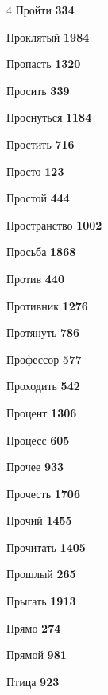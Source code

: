 \begin{multicols}{4}
\noindent Пройти \dotfill \textbf{\color{secondary} 334}\par
\noindent Проклятый \dotfill \textbf{\color{secondary} 1984}\par
\noindent Пропасть \dotfill \textbf{\color{secondary} 1320}\par
\noindent Просить \dotfill \textbf{\color{secondary} 339}\par
\noindent Проснуться \dotfill \textbf{\color{secondary} 1184}\par
\noindent Простить \dotfill \textbf{\color{secondary} 716}\par
\noindent Просто \dotfill \textbf{\color{secondary} 123}\par
\noindent Простой \dotfill \textbf{\color{secondary} 444}\par
\noindent Пространство \dotfill \textbf{\color{secondary} 1002}\par
\noindent Просьба \dotfill \textbf{\color{secondary} 1868}\par
\noindent Против \dotfill \textbf{\color{secondary} 440}\par
\noindent Противник \dotfill \textbf{\color{secondary} 1276}\par
\noindent Протянуть \dotfill \textbf{\color{secondary} 786}\par
\noindent Профессор \dotfill \textbf{\color{secondary} 577}\par
\noindent Проходить \dotfill \textbf{\color{secondary} 542}\par
\noindent Процент \dotfill \textbf{\color{secondary} 1306}\par
\noindent Процесс \dotfill \textbf{\color{secondary} 605}\par
\noindent Прочее \dotfill \textbf{\color{secondary} 933}\par
\noindent Прочесть \dotfill \textbf{\color{secondary} 1706}\par
\noindent Прочий \dotfill \textbf{\color{secondary} 1455}\par
\noindent Прочитать \dotfill \textbf{\color{secondary} 1405}\par
\noindent Прошлый \dotfill \textbf{\color{secondary} 265}\par
\noindent Прыгать \dotfill \textbf{\color{secondary} 1913}\par
\noindent Прямо \dotfill \textbf{\color{secondary} 274}\par
\noindent Прямой \dotfill \textbf{\color{secondary} 981}\par
\noindent Птица \dotfill \textbf{\color{secondary} 923}\par

\end{multicols}
